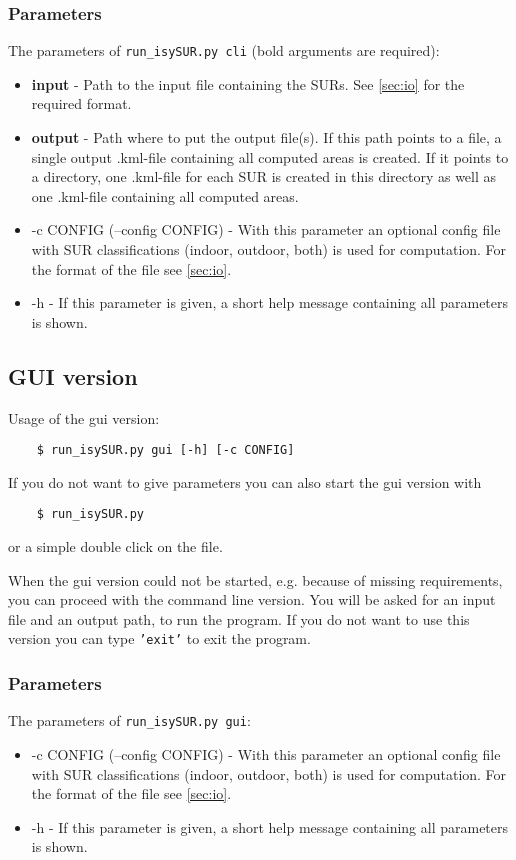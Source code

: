 \documentclass[11pt,fleqn]{book} %
\begin{document}
\subsubsection{Parameters}
The parameters of \texttt{run\_isySUR.py cli} (bold arguments are required):
\begin{itemize}
	\item \textbf{input} - Path to the input file containing the SURs. See \ref{sec:io} for the required format.
	\item \textbf{output} - Path where to put the output file(s). If this path points to a file, a single output .kml-file containing all computed areas is created. If it points to a directory, one .kml-file for each SUR is created in this directory as well as one .kml-file containing all computed areas.
	\item -c CONFIG (--config CONFIG) - With this parameter an optional config file with SUR classifications (indoor, outdoor, both) is used for computation. For the format of the file see \ref{sec:io}.
	\item -h - If this parameter is given, a short help message containing all parameters is shown.
\end{itemize}

\subsection{GUI version}\label{sec:gui}
Usage of the gui version:
\begin{verbatim}
	$ run_isySUR.py gui [-h] [-c CONFIG]
\end{verbatim}
If you do not want to give parameters you can also start the gui version with
\begin{verbatim}
	$ run_isySUR.py
\end{verbatim}
or a simple double click on the file.

When the gui version could not be started, e.g. because of missing requirements, you can proceed with the command line version. You will be asked for an input file and an output path, to run the program. If you do not want to use this version you can type \texttt{'exit'} to exit the program.

\subsubsection{Parameters}
The parameters of \texttt{run\_isySUR.py gui}:
\begin{itemize}
	\item -c CONFIG (--config CONFIG) - With this parameter an optional config file with SUR classifications (indoor, outdoor, both) is used for computation. For the format of the file see \ref{sec:io}.
	\item -h - If this parameter is given, a short help message containing all parameters is shown.
\end{itemize}
\end{document}
